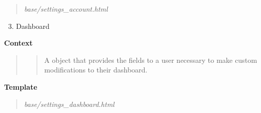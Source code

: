 \documentclass[letterpaper,10pt,english]{sphinxmanual}
\begin{document}
\begin{fulllineitems}
\begin{quote}
\emph{base/settings\_account.html}
\end{quote}
\begin{enumerate}
\setcounter{enumi}{2}
\item {} 
Dashboard

\end{enumerate}

\textbf{Context}
\begin{quote}

\begin{quote}

A {\hyperref[modules/webapp:webapp.views.SettingsForm]{\emph{}}} object that provides the
fields to a user necessary to make custom modifications to their
dashboard.
\end{quote}
\end{quote}

\textbf{Template}
\begin{quote}

\emph{base/settings\_dashboard.html}
\end{quote}

\end{fulllineitems}

\end{document}
